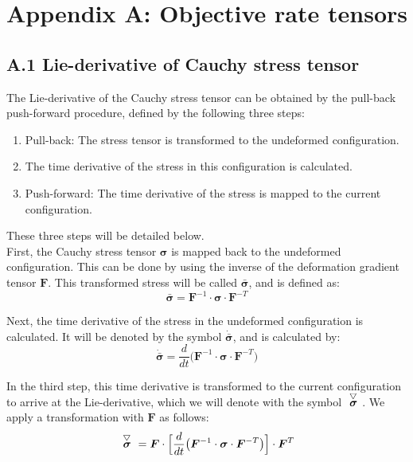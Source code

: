 \section*{Appendix A: Objective rate tensors}
\setcounter{table}{0}
\renewcommand{\thetable}{A\arabic{table}}
\renewcommand{\theequation}{A.\arabic{equation}}
\renewcommand{\thefigure}{A.\arabic{figure}}
%

\subsection*{A.1 Lie-derivative of Cauchy stress tensor}
%
The Lie-derivative of the Cauchy stress tensor can be obtained by the pull-back push-forward procedure, defined by the following three steps:
\begin{enumerate}
    \item Pull-back: The stress tensor is transformed to the undeformed configuration.
    \item The time derivative of the stress in this configuration is calculated.
    \item Push-forward: The time derivative of the stress is mapped to the current configuration.
\end{enumerate}
These three steps will be detailed below.\\
\newline
First, the Cauchy stress tensor $\boldsymbol{\sigma}$ is mapped back to the undeformed configuration. This can be done by using the inverse of the deformation gradient tensor $\boldsymbol{F}$. This transformed stress will be called $\bar{\boldsymbol{\sigma}}$, and is defined as:
\begin{equation}\label{AppA_sigmabar}
\bar{\boldsymbol{\sigma}} = \boldsymbol{F}^{-1}\cdot\boldsymbol{\sigma}\cdot\boldsymbol{F}^{-T}
\end{equation}

Next, the time derivative of the stress in the undeformed configuration is calculated. It will be denoted by the symbol $\dot{\bar{\boldsymbol{\sigma}}}$, and is calculated by:
\begin{equation}
\dot{\bar{\boldsymbol{\sigma}}} = \frac{d}{dt}\big(\boldsymbol{F}^{-1}\cdot\boldsymbol{\sigma}\cdot\boldsymbol{F}^{-T}\big)
\end{equation}

In the third step, this time derivative is transformed to the current configuration to arrive at the Lie-derivative, which we will denote with the symbol $\acctriang{\boldsymbol{\sigma}}$. We apply a transformation with $\boldsymbol{F}$ as follows:
\begin{equation}
\acctriang{\boldsymbol{\sigma}} = \boldsymbol{F}\cdot\Big[\frac{d}{dt}\big(\boldsymbol{F}^{-1}\cdot\boldsymbol{\sigma}\cdot\boldsymbol{F}^{-T}\big)\Big]\cdot\boldsymbol{F}^T
\end{equation}

